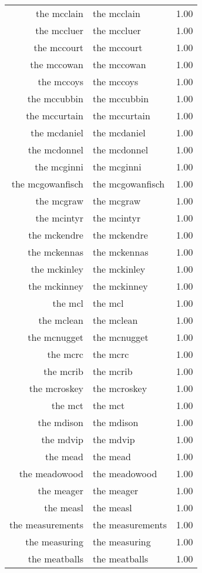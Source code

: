 \begin{table}[ht]
\begin{tabular}{rlr}
  the mcclain & the mcclain & 1.00 \\ 
  the mccluer & the mccluer & 1.00 \\ 
  the mccourt & the mccourt & 1.00 \\ 
  the mccowan & the mccowan & 1.00 \\ 
  the mccoys & the mccoys & 1.00 \\ 
  the mccubbin & the mccubbin & 1.00 \\ 
  the mccurtain & the mccurtain & 1.00 \\ 
  the mcdaniel & the mcdaniel & 1.00 \\ 
  the mcdonnel & the mcdonnel & 1.00 \\ 
  the mcginni & the mcginni & 1.00 \\ 
  the mcgowanfisch & the mcgowanfisch & 1.00 \\ 
  the mcgraw & the mcgraw & 1.00 \\ 
  the mcintyr & the mcintyr & 1.00 \\ 
  the mckendre & the mckendre & 1.00 \\ 
  the mckennas & the mckennas & 1.00 \\ 
  the mckinley & the mckinley & 1.00 \\ 
  the mckinney & the mckinney & 1.00 \\ 
  the mcl & the mcl & 1.00 \\ 
  the mclean & the mclean & 1.00 \\ 
  the mcnugget & the mcnugget & 1.00 \\ 
  the mcrc & the mcrc & 1.00 \\ 
  the mcrib & the mcrib & 1.00 \\ 
  the mcroskey & the mcroskey & 1.00 \\ 
  the mct & the mct & 1.00 \\ 
  the mdison & the mdison & 1.00 \\ 
  the mdvip & the mdvip & 1.00 \\ 
  the mead & the mead & 1.00 \\ 
  the meadowood & the meadowood & 1.00 \\ 
  the meager & the meager & 1.00 \\ 
  the measl & the measl & 1.00 \\ 
  the measurements & the measurements & 1.00 \\ 
  the measuring & the measuring & 1.00 \\ 
  the meatballs & the meatballs & 1.00 \\ 

\end{tabular}
\end{table}
